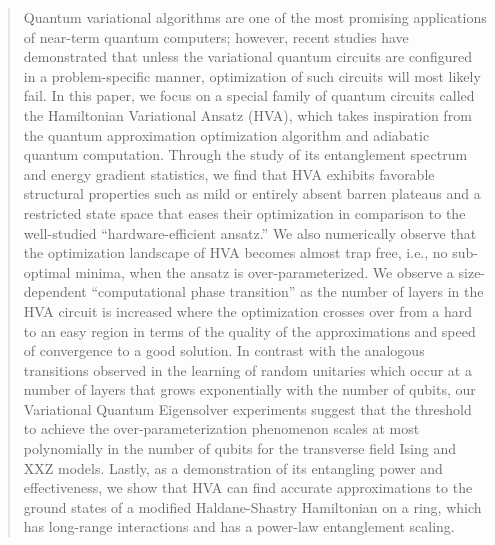 \documentclass[
 aps,
 pra,
 showpacs,
 showkeys,
 superscriptaddress,
 reprint,%
twocolumn,
]{revtex4-1}
\begin{document}
\begin{abstract}

    
    Quantum variational algorithms are one of the most promising applications of near-term quantum computers; however, recent studies have demonstrated that unless the variational quantum circuits are configured in a problem-specific manner, optimization of such circuits will most likely fail. In this paper, we focus on a special family of quantum circuits called the Hamiltonian Variational Ansatz (HVA), which takes inspiration from the quantum approximation optimization algorithm and adiabatic quantum computation. Through the study of its entanglement spectrum and energy gradient statistics, we find that HVA exhibits favorable structural properties such as mild or entirely absent barren plateaus and a restricted state space that eases their optimization in comparison to the well-studied ``hardware-efficient ansatz.'' We also numerically observe that the optimization landscape of HVA becomes almost trap free, i.e., no sub-optimal minima, when the ansatz is over-parameterized. We observe a size-dependent ``computational phase transition'' as the number of layers in the HVA circuit is increased where the optimization crosses over from a hard to an easy region in terms of the quality of the approximations and speed of convergence to a good solution. In contrast with the analogous transitions observed in the learning of random unitaries which occur at a number of layers that grows exponentially with the number of qubits, our Variational Quantum Eigensolver experiments suggest that the threshold to achieve the over-parameterization phenomenon scales at most polynomially in the number of qubits for the transverse field Ising and XXZ models. Lastly, as a demonstration of its entangling power and effectiveness, we show that HVA can find accurate approximations to the ground states of a modified Haldane-Shastry Hamiltonian on a ring, which has long-range interactions and has a power-law entanglement scaling.
    
    
\end{abstract}



\maketitle
\end{document}

